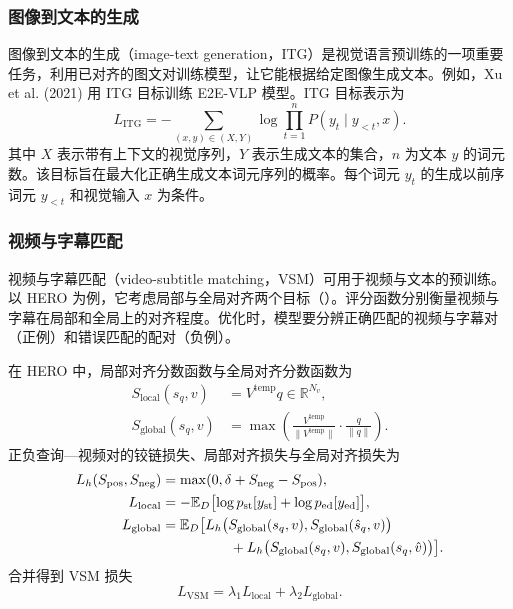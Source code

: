 \subsubsection{图像到文本的生成}
图像到文本的生成（image-text generation，ITG）是视觉语言预训练的一项重要任务，利用已对齐的图文对训练模型，让它能根据给定图像生成文本。例如，Xu et al. (2021) 用 ITG 目标训练 E2E-VLP 模型。ITG 目标表示为
\begin{equation}
L_{\mathrm{ITG}}=-\sum_{(x,y)\in(X,Y)}
\log\prod_{t=1}^{n}P(y_t\mid y_{<t},x).
\label{eq:ch09-itg-loss}
\end{equation}
其中 $X$ 表示带有上下文的视觉序列，$Y$ 表示生成文本的集合，$n$ 为文本 $y$ 的词元数。该目标旨在最大化正确生成文本词元序列的概率。每个词元 $y_t$ 的生成以前序词元 $y_{<t}$ 和视觉输入 $x$ 为条件。

\subsubsection{视频与字幕匹配}
视频与字幕匹配（video-subtitle matching，VSM）可用于视频与文本的预训练。以 HERO 为例，它考虑局部与全局对齐两个目标（）。评分函数分别衡量视频与字幕在局部和全局上的对齐程度。优化时，模型要分辨正确匹配的视频与字幕对（正例）和错误匹配的配对（负例）。

在 HERO 中，局部对齐分数函数与全局对齐分数函数为
\[
\begin{aligned}
S_{\mathrm{local}}(s_q,v)&=V^{\mathrm{temp}}q\in\mathbb{R}^{N_v},\\
S_{\mathrm{global}}(s_q,v)&=\max\left(
  \frac{V^{\mathrm{temp}}}{\lVert V^{\mathrm{temp}}\rVert}
  \cdot\frac{q}{\lVert q\rVert}
\right).
\end{aligned}
\]
正负查询—视频对的铰链损失、局部对齐损失与全局对齐损失为
\[
\begin{aligned}
L_h(S_{\mathrm{pos}},S_{\mathrm{neg}})
 &=\max(0,\delta+S_{\mathrm{neg}}-S_{\mathrm{pos}}),\\
L_{\mathrm{local}}
 &=-\mathbb{E}_D\bigl[\log p_{\mathrm{st}}[y_{\mathrm{st}}]
                      +\log p_{\mathrm{ed}}[y_{\mathrm{ed}}]\bigr],\\
L_{\mathrm{global}}
 &=\mathbb{E}_D\bigl[
    L_h\bigl(S_{\mathrm{global}}(s_q,v),S_{\mathrm{global}}(\hat{s}_q,v)\bigr)\\
 &\hspace{4.9em}{}+L_h\bigl(S_{\mathrm{global}}(s_q,v),S_{\mathrm{global}}(s_q,\hat{v})\bigr)
    \bigr].
\end{aligned}
\]
合并得到 VSM 损失
\[
L_{\mathrm{VSM}}=\lambda_1 L_{\mathrm{local}}+\lambda_2 L_{\mathrm{global}}.
\]

